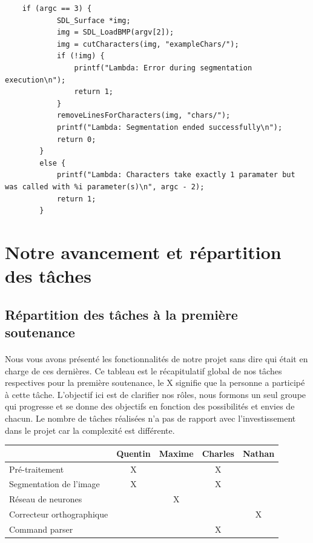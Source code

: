 \documentclass{article}
\begin{document}
\begin{lstlisting}
	if (argc == 3) {
			SDL_Surface *img;
			img = SDL_LoadBMP(argv[2]);
			img = cutCharacters(img, "exampleChars/");
			if (!img) {
				printf("Lambda: Error during segmentation execution\n");
				return 1;
			}
			removeLinesForCharacters(img, "chars/");
			printf("Lambda: Segmentation ended successfully\n");
			return 0;
		}
		else {
			printf("Lambda: Characters take exactly 1 paramater but was called with %i parameter(s)\n", argc - 2);
			return 1;
		}
\end{lstlisting}

\newpage
{}
\section{Notre avancement et répartition des tâches}


\subsection{Répartition des tâches à la première soutenance}

\paragraph{} Nous vous avons présenté les fonctionnalités de notre projet sans dire qui était en charge de ces dernières. Ce tableau est le récapitulatif global de nos tâches respectives pour la première soutenance, le X signifie que la personne a participé à cette tâche. L'objectif ici est de clarifier nos rôles, nous formons un seul groupe qui progresse et se donne des objectifs en fonction des possibilités et envies de chacun. Le nombre de tâches réalisées n'a pas de rapport avec l'investissement dans le projet car la complexité est différente.
\begin{center}
\vspace*{0.2cm}
\begin{tabular}{|l|c|c|c|c|}
  \hline
  & Quentin & Maxime & Charles & Nathan \\
  \hline
  Pré-traitement & X &  & X &  \\
  \hline
  Segmentation de l'image & X &  & X &  \\
  \hline
  Réseau de neurones &  & X &  &  \\
  \hline
  Correcteur orthographique &  &  &  & X \\
  \hline
  Command parser &  &  & X &  \\
  \hline
\end{tabular}
\end{center}
\end{document}
